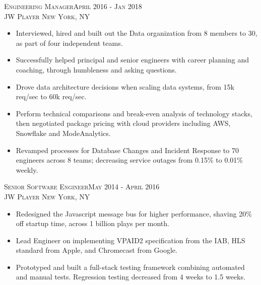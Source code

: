 \textsc{Engineering Manager\hfill April 2016 - Jan 2018\\}
\textsc{JW Player \hfill New York, NY\\}
\begin{itemize}
	\setlength{\itemsep}{1pt}
	\setlength{\parskip}{0pt}
	\setlength{\parsep}{0pt}
	\setlength{\leftmargin}{-5mm}
	\item Interviewed, hired and built out the Data organization from 8 members to 30, as part of four independent teams.
	\item Successfully helped principal and senior engineers with career planning and coaching, through humbleness and asking questions.
	\item Drove data architecture decisions when scaling data systems, from 15k req/sec to 60k req/sec.
	\item Perform technical comparisons and break-even analysis of technology stacks, then negotiated package pricing with cloud providers including AWS, Snowflake and ModeAnalytics.
	\item Revamped processes for Database Changes and Incident Response to 70 engineers across 8 teams; decreasing service outages from 0.15\% to 0.01\% weekly.
\end{itemize}


\textsc{Senior Software Engineer\hfill May 2014 - April 2016\\}
\textsc{JW Player \hfill New York, NY\\}
\begin{itemize}
	\setlength{\itemsep}{1pt}
	\setlength{\itemsep}{1pt}
	\setlength{\parskip}{0pt}
	\setlength{\parsep}{0pt}
	\setlength{\leftmargin}{-5mm}
  \item Redesigned the Javascript message bus for higher performance, shaving 20\% off startup time, across 1 billion plays per month.
  \item Lead Engineer on implementing VPAID2 specification from the IAB, HLS standard from Apple, and Chromecast from Google.
  \item Prototyped and built a full-stack testing framework combining automated and manual tests. Regression testing decreased from 4 weeks to 1.5 weeks.
\end{itemize}


